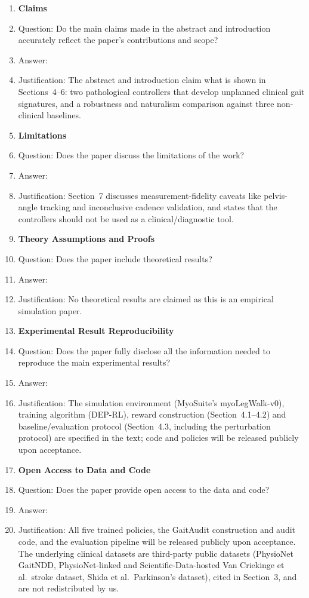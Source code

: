 \documentclass{article}
\begin{document}
\begin{enumerate}

\item {\bf Claims}
    \item[] Question: Do the main claims made in the abstract and introduction accurately reflect the paper's contributions and scope?
    \item[] Answer: \answerYes{}
    \item[] Justification: The abstract and introduction claim what is shown in Sections~4--6: two pathological controllers that develop unplanned clinical gait signatures, and a robustness and naturalism comparison against three non-clinical baselines.

\item {\bf Limitations}
    \item[] Question: Does the paper discuss the limitations of the work?
    \item[] Answer: \answerYes{}
    \item[] Justification: Section~7 discusses measurement-fidelity caveats like pelvis-angle tracking and inconclusive cadence validation, and states that the controllers should not be used as a clinical/diagnostic tool.

\item {\bf Theory Assumptions and Proofs}
    \item[] Question: Does the paper include theoretical results?
    \item[] Answer: \answerNA{}
    \item[] Justification: No theoretical results are claimed as this is an empirical simulation paper.

\item {\bf Experimental Result Reproducibility}
    \item[] Question: Does the paper fully disclose all the information needed to reproduce the main experimental results?
    \item[] Answer: \answerYes{}
    \item[] Justification: The simulation environment (MyoSuite's myoLegWalk-v0), training algorithm (DEP-RL), reward construction (Section~4.1--4.2) and baseline/evaluation protocol (Section~4.3, including the perturbation protocol) are specified in the text; code and policies will be released publicly upon acceptance.

\item {\bf Open Access to Data and Code}
    \item[] Question: Does the paper provide open access to the data and code?
    \item[] Answer: \answerYes{}
    \item[] Justification: All five trained policies, the GaitAudit construction and audit code, and the evaluation pipeline will be released publicly upon acceptance. The underlying clinical datasets are third-party public datasets (PhysioNet GaitNDD, PhysioNet-linked and Scientific-Data-hosted Van Criekinge et al.\ stroke dataset, Shida et al.\ Parkinson's dataset), cited in Section~3, and are not redistributed by us.


\end{enumerate}
\end{document}

